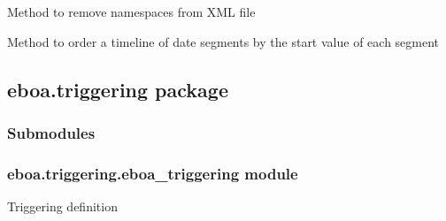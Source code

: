 
\begin{fulllineitems}
\label{\detokenize{eboa.ingestion:eboa.ingestion.functions.remove_namespaces}}
Method to remove namespaces from XML file

\end{fulllineitems}


\begin{fulllineitems}
\label{\detokenize{eboa.ingestion:eboa.ingestion.functions.sort_timeline_by_start}}
Method to order a timeline of date segments by the start value of each segment

\end{fulllineitems}



\subsection{eboa.triggering package}
\label{\detokenize{eboa.triggering:eboa-triggering-package}}\label{\detokenize{eboa.triggering::doc}}

\subsubsection{Submodules}
\label{\detokenize{eboa.triggering:submodules}}

\subsubsection{eboa.triggering.eboa\_triggering module}
\label{\detokenize{eboa.triggering:module-eboa.triggering.eboa_triggering}}\label{\detokenize{eboa.triggering:eboa-triggering-eboa-triggering-module}}
Triggering definition

